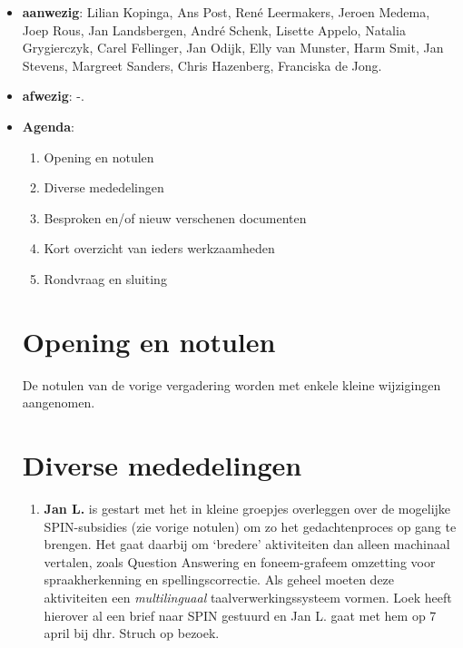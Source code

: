 
   \RosDate{\today}
   \RosSupersedes{-}
   \MakeRosTitle
\begin{itemize}
  \item {\bf aanwezig}: Lilian Kopinga, Ans Post, Ren\'{e} Leermakers, 
             Jeroen Medema, Joep Rous, Jan Landsbergen, Andr\'{e} Schenk, 
             Lisette Appelo, Natalia Grygierczyk, Carel Fellinger, Jan Odijk, 
             Elly van Munster, Harm Smit, Jan Stevens, Margreet Sanders,
             Chris Hazenberg, Franciska de Jong.
  \item {\bf afwezig}: -.
  \item {\bf Agenda}:
    \begin{enumerate}
       \item Opening en notulen
       \item Diverse mededelingen
       \item Besproken en/of nieuw verschenen documenten
       \item Kort overzicht van ieders werkzaamheden
       \item Rondvraag en sluiting
    \end{enumerate}
\section {Opening en notulen}
De notulen van de vorige vergadering worden met enkele kleine wijzigingen
aangenomen.
\section {Diverse mededelingen}
\begin{enumerate}
  \item {\bf Jan L.} is gestart met het in kleine groepjes overleggen over de
mogelijke SPIN-subsidies (zie vorige notulen) om zo het gedachtenproces 
op gang te brengen. Het gaat daarbij om `bredere' aktiviteiten dan alleen 
machinaal vertalen, zoals Question Answering en foneem-grafeem
omzetting voor spraakherkenning en spellingscorrectie. Als geheel moeten deze
aktiviteiten een {\em multilinguaal} taalverwerkingssysteem vormen.
Loek heeft hierover al een brief naar SPIN gestuurd en Jan L. gaat met hem op 
7 april bij dhr. Struch op bezoek.


\end{enumerate}
\end{itemize}
